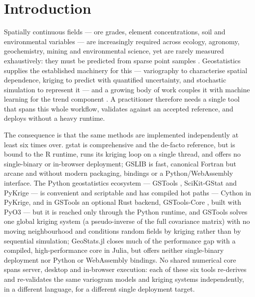 \documentclass[pdflatex,sn-mathphys-ay]{sn-jnl}
\begin{document}
\section{Introduction}\label{sec:intro}

Spatially continuous fields --- ore grades, element concentrations, soil and
environmental variables --- are increasingly required across ecology, agronomy,
geochemistry, mining and environmental science, yet are rarely measured
exhaustively: they must be predicted from sparse point samples
\citep{li2021,goovaerts1997}. Geostatistics supplies the established machinery
for this --- variography to characterise spatial dependence, kriging to predict
with quantified uncertainty, and stochastic simulation to represent it --- and a
growing body of work couples it with machine learning for the trend component
\citep{hengl2018}. A practitioner therefore needs a single tool that spans this
whole workflow, validates against an accepted reference, and deploys without a
heavy runtime.

The consequence is that the same methods are implemented independently at
least six times over. gstat \citep{pebesma2004} is comprehensive and the
de-facto reference, but is bound to the R runtime, runs its kriging loop on a
single thread, and offers no single-binary or in-browser deployment; GSLIB
\citep{deutsch1998} is fast, canonical Fortran but arcane and without modern
packaging, bindings or a Python/WebAssembly interface. The Python
geostatistics ecosystem --- GSTools \citep{mueller2022}, SciKit-GStat
\citep{maelicke2022} and PyKrige \citep{pykrige} --- is convenient and scriptable and has compiled hot paths --- Cython in PyKrige,
and in GSTools an optional Rust backend, GSTools-Core \citep{gstoolscore},
built with PyO3 --- but it is reached only through the Python runtime, and
GSTools solves one global kriging system (a pseudo-inverse of the full
covariance matrix) with no moving neighbourhood and conditions random fields by
kriging rather than by sequential simulation;
GeoStats.jl \citep{hoffimann2018} closes much of the performance gap with a
compiled, high-performance core in Julia, but offers neither single-binary
deployment nor Python or WebAssembly bindings. No shared numerical core spans
server, desktop and in-browser execution: each of these six tools re-derives
and re-validates the same variogram models and kriging systems independently,
in a different language, for a different single deployment target.
\end{document}
